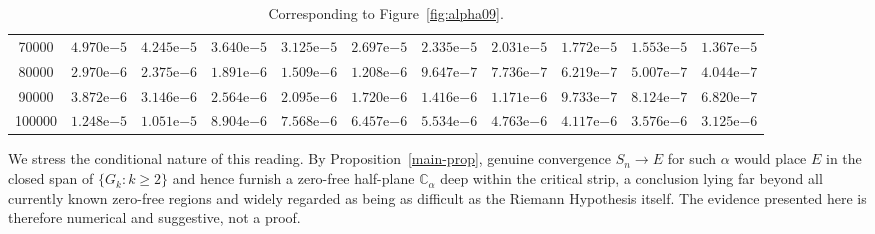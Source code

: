 \documentclass[11pt]{extarticle}
\numberwithin{equation}{section}
\theoremstyle{plain}
\theoremstyle{definition}
\begin{document}
\begin{table}[ht!]
{\begin{tabular}{|c|c|c|c|c|c|c|c|c|c|c|}
70000  & $4.970\mathrm{e}{-5}$ & $4.245\mathrm{e}{-5}$ & $3.640\mathrm{e}{-5}$ & $3.125\mathrm{e}{-5}$ & $2.697\mathrm{e}{-5}$ & $2.335\mathrm{e}{-5}$ & $2.031\mathrm{e}{-5}$ & $1.772\mathrm{e}{-5}$ & $1.553\mathrm{e}{-5}$ & $1.367\mathrm{e}{-5}$ \\
80000  & $2.970\mathrm{e}{-6}$ & $2.375\mathrm{e}{-6}$ & $1.891\mathrm{e}{-6}$ & $1.509\mathrm{e}{-6}$ & $1.208\mathrm{e}{-6}$ & $9.647\mathrm{e}{-7}$ & $7.736\mathrm{e}{-7}$ & $6.219\mathrm{e}{-7}$ & $5.007\mathrm{e}{-7}$ & $4.044\mathrm{e}{-7}$ \\
90000  & $3.872\mathrm{e}{-6}$ & $3.146\mathrm{e}{-6}$ & $2.564\mathrm{e}{-6}$ & $2.095\mathrm{e}{-6}$ & $1.720\mathrm{e}{-6}$ & $1.416\mathrm{e}{-6}$ & $1.171\mathrm{e}{-6}$ & $9.733\mathrm{e}{-7}$ & $8.124\mathrm{e}{-7}$ & $6.820\mathrm{e}{-7}$ \\
100000 & $1.248\mathrm{e}{-5}$ & $1.051\mathrm{e}{-5}$ & $8.904\mathrm{e}{-6}$ & $7.568\mathrm{e}{-6}$ & $6.457\mathrm{e}{-6}$ & $5.534\mathrm{e}{-6}$ & $4.763\mathrm{e}{-6}$ & $4.117\mathrm{e}{-6}$ & $3.576\mathrm{e}{-6}$ & $3.125\mathrm{e}{-6}$ \\
\hline
\end{tabular}}
\caption{Corresponding to Figure~\ref{fig:alpha09}.}
\label{tab:alpha09}
\end{table}

We stress the conditional nature of this reading. By Proposition~\ref{main-prop},
genuine convergence $S_n \to E$ for such $\alpha$ would place $E$ in the closed
span of $\{G_k : k \geq 2\}$ and hence furnish a zero-free half-plane
$\mathbb{C}_\alpha$ deep within the critical strip, a conclusion lying far
beyond all currently known zero-free regions and widely regarded as being as
difficult as the Riemann Hypothesis itself. The evidence presented here is
therefore numerical and suggestive, not a proof. 

\clearpage
\end{document}
